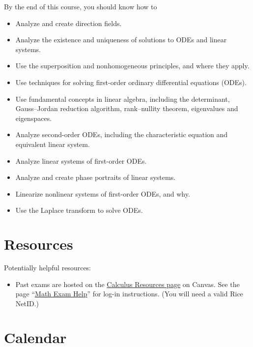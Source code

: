 By the end of this course, you should know how to
\begin{itemize}
\item Analyze and create direction fields.
\item Analyze the existence and uniqueness of solutions to ODEs and linear systems.
\item Use the superposition and nonhomogeneous principles, and where they apply.
\item Use techniques for solving first-order ordinary differential equations (ODEs).
\item Use fundamental concepts in linear algebra, including the determinant, Gauss--Jordan reduction algorithm, rank--nullity theorem, eigenvalues and eigenspaces.
\item Analyze second-order ODEs, including the characteristic equation and equivalent linear system.
\item Analyze linear systems of first-order ODEs.
\item Analyze and create phase portraits of linear systems.
\item Linearize nonlinear systems of first-order ODEs, and why.
\item Use the Laplace transform to solve ODEs.
\end{itemize}





%
%
%
%

\section{Resources}

Potentially helpful resources:
\begin{itemize}
\item Past exams are hosted on the \href{https://canvas.rice.edu/courses/9592/files}{Calculus Resources page} on Canvas. See the page ``\href{https://math.rice.edu/exam-help}{Math Exam Help}'' for log-in instructions. (You will need a valid Rice NetID.)
\end{itemize}




%
%
%
%


\newpage

\section{Calendar}
\label{sec: Calendar}

